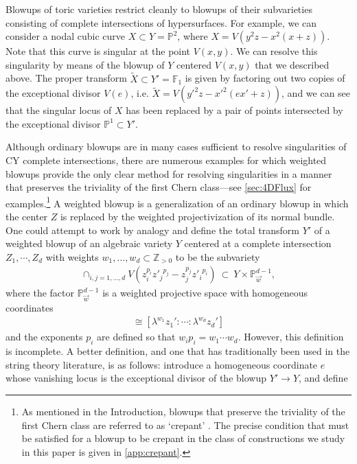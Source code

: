 \documentclass[11pt,oneside,english]{article}
\numberwithin{equation}{section}
\theoremstyle{definition}
\begin{document}
Blowups of toric varieties restrict cleanly to blowups of their subvarieties consisting of complete intersections of hypersurfaces. For example, we can consider a nodal cubic curve $X \subset Y= \mathbb P^2$, where $X = V(y^2z- x^2 (x+ z) )$. Note that this curve is singular at the point $V(x,y)$. We can resolve this singularity by means of the blowup of $Y$ centered $V(x,y)$ that we described above. The proper transform $ \widetilde X \subset  Y' = \mathbb F_1$ is given by factoring out two copies of the exceptional divisor $V(e)$, i.e. $\widetilde X = V(  y'^2 z -  x'^2 (e  x'+  z))$, and we can see that the singular locus of $X$ has been replaced by a pair of points intersected by the exceptional divisor $\mathbb P^1 \subset  Y'$.
	
Although ordinary blowups are in many cases sufficient to resolve singularities of CY complete intersections, there are numerous examples for which weighted blowups provide the only clear method for resolving singularities in a manner that preserves the triviality of the first Chern class---see \cref{sec:4DFlux} for examples.\footnote{As mentioned in the Introduction, blowups that preserve the triviality of the first Chern class are referred to as `crepant' \cite{reid1983minimal}. The precise condition that must be satisfied for a blowup to be crepant in the class of constructions we study in this paper is given in \cref{app:crepant}.} A weighted blowup is a generalization of an ordinary blowup in which the center $Z$ is replaced by the weighted projectivization of its normal bundle. One could attempt to work by analogy and define the total transform $Y'$ of a weighted blowup of an algebraic variety $Y$ centered at a complete intersection $Z_1, \cdots, Z_d$ with weights $w_1, \dots, w_d \subset \mathbb Z_{>0}$ to be the subvariety 
	\begin{align}
		\cap_{i,j=1,\dots,d} V(z_i^{p_i} {z'_j}^{p_j} - z_j^{p_j} {z'_i}^{p_i}  )~\subset~ Y \times \mathbb P^{d-1}_{\vec w},
	\end{align}
where the factor $\mathbb P^{d-1}_{\vec w}$ is a weighted projective space with homogeneous coordinates
	\begin{align}
		[ z_1':\cdots : z_d'] \cong [\lambda^{w_1 }  z_1':\cdots : \lambda^{w_d}  z_d']
	\end{align}
and the exponents $p_i$ are defined so that $w_i p_i = w_1 \cdots w_d$. However, this definition is incomplete. A better definition, and one that has traditionally been used in the string theory literature, is as follows: introduce a homogeneous coordinate $e$ whose vanishing locus is the exceptional divisor of the blowup $Y' \rightarrow Y$, and define
\end{document}
